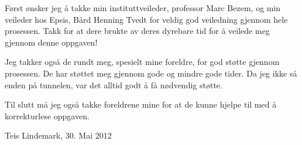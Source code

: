 Først ønsker jeg å takke min instituttveileder, professor Marc Bezem, og min veileder hos Epsis, Bård Henning Tvedt for veldig god veiledning gjennom hele prosessen. Takk for at dere brukte av deres dyrebare tid for å veilede meg gjennom denne oppgaven!

Jeg takker også de rundt meg, spesielt mine foreldre, for god støtte gjennom prosessen. De har støttet meg gjennom gode og mindre gode tider. Da jeg ikke så enden på tunnelen, var det alltid godt å få nødvendig støtte.

Til slutt må jeg også takke foreldrene mine for at de kunne hjelpe til med å korrekturlese oppgaven.

Teis Lindemark, 30. Mai 2012